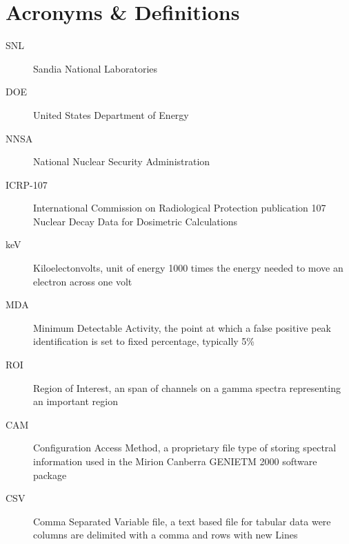 \documentclass[12pt,report,justified]{SANDreport}
\begin{document}
    \chapter*{Acronyms \& Definitions}
    \begin{description}
	\item[SNL]
	     Sandia National Laboratories
	\item[DOE]
	     United States Department of Energy
	\item[NNSA]
	     National Nuclear Security Administration
          \item[ICRP-107]
	     International Commission on Radiological Protection publication 107 Nuclear Decay Data for Dosimetric Calculations
	\item[keV]
	     Kiloelectonvolts, unit of energy 1000 times the energy needed to move an electron across one volt
	\item[MDA]
	     Minimum Detectable Activity, the point at which a false positive peak identification is set to fixed percentage, typically 5\%
	\item[ROI]
	     Region of Interest, an span of channels on a gamma spectra representing an important region
	\item[CAM]
	     Configuration Access Method, a proprietary file type of storing spectral information used in the Mirion Canberra GENIETM 2000 software package
	\item[CSV]
	     Comma Separated Variable file, a text based file for tabular data were columns are delimited with a comma and rows with new Lines
    \end{description}


    \SANDmain		%
\end{document}
